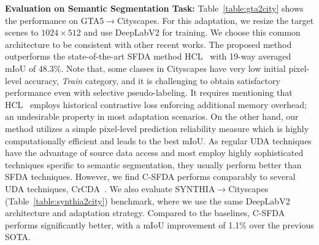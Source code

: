 \documentclass[10pt,twocolumn,letterpaper]{article}
\begin{document}
\vspace{0.7mm}

\noindent \textbf{Evaluation on Semantic Segmentation Task:}
Table~\ref{table:gta2city} shows the performance on  GTA5$\to$Cityscapes. For this adaptation, we resize the target scenes to $1024\times512$ and use DeepLabV2 for training. We choose this common architecture to be consistent with other recent works. The proposed method outperforms the state-of-the-art SFDA method HCL~\cite{huang2021model} with 19-way averaged mIoU of 48.3\%. Note that, some classes in Cityscapes have very low initial pixel-level accuracy, \eg \emph{Train} category, and it is challenging to obtain satisfactory  performance even with selective pseudo-labeling. It requires mentioning that HCL~\cite{huang2021model} employs historical contrastive loss enforcing additional memory overhead; an undesirable property in most adaptation scenarios. On the other hand, our method utilizes a simple pixel-level prediction reliability measure which is highly computationally efficient and leads to the best mIoU. As regular UDA techniques have the advantage of source data access and most employ highly sophisticated techniques specific to semantic segmentation, they usually perform better than SFDA techniques. However, we find C-SFDA performs comparably to several UDA techniques, \eg CrCDA~\cite{huang2020contextual}. We also evaluate SYNTHIA$\to$Cityscapes (Table~\ref{table:synthia2city}) benchmark, where we use the same DeepLabV2 architecture and adaptation strategy. Compared to the baselines, C-SFDA performs significantly better, with a mIoU improvement of 1.1\% over the previous SOTA. 
\end{document}
